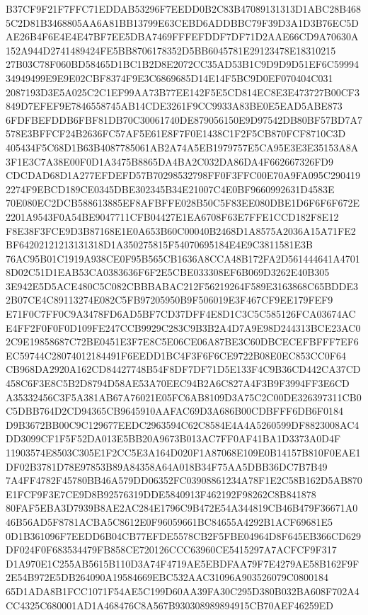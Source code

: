 \documentclass[UTF8,fontset=fandol,zihao=-4,a4paper]{ctexart}
\begin{document}
{{B37CF9F21F7FFC71EDDAB53296F7EEDD0B2C83B47089131313D1ABC28B4685C2D81B3468805AA6A81BB13799E63CEBD6ADDBBC79F39D3A1D3B76EC5D
AE26B4F6E4E4E47BF7EE5DBA7469FFFEFDDF7DF71D2AAE66CD9A70630A152A944D2741489424FE5BB8706178352D5BB6045781E29123478E18310215
27B03C78F060BD58465D1BC1B2D8E2072CC35AD53B1C9D9D9D51EF6C5999434949499E9E9E02CBF8374F9E3C6869685D14E14F5BC9D0EF070404C031
2087193D3E5A025C2C1EF99AA73B77EE142F5E5CD814EC8E3E473727B00CF3849D7EFEF9E7846558745AB14CDE3261F9CC9933A83BE0E5EAD5ABE873
6FDFBEFDDB6FBF81DB70C30061740DE879056150E9D97542DB80BF57BD7A7578E3BFFCF24B2636FC57AF5E61E8F7F0E1438C1F2F5CB870FCF8710C3D
405434F5C68D1B63B4087785061AB2A74A5EB1979757E5CA95E3E3E35153A8A3F1E3C7A38E00F0D1A3475B8865DA4BA2C032DA86DA4F662667326FD9
CDCDAD68D1A277EFDEFD57B70298532798FF0F3FFC00E70A9FA095C2904192274F9EBCD189CE0345DBE302345B34E21007C4E0BF9660992631D4583E
70E080EC2DCB588613885EF8AFBFFE028B50C5F83EE080DBE1D6F6F6F672E2201A9543F0A54BE9047711CFB04427E1EA6708F63E7FFE1CCD182F8E12
F8E38F3FCE9D3B87168E1E0A653B60C00040B2468D1A8575A2036A15A71FE2BF64202121213131318D1A350275815F54070695184E4E9C3811581E3B
76AC95B01C1919A938CE0F95B565CB1636A8CCA48B172FA2D561444641A47018D02C51D1EAB53CA0383636F6F2E5CBE033308EF6B069D3262E40B305
3E942E5D5ACE480C5C082CBBBABAC212F56219264F589E3163868C65BDDE32B07CE4C89113274E082C5FB97205950B9F506019E3F467CF9EE179FEF9
E71F0C7FF0C9A3478FD6AD5BF7CD37DFF4E8D1C3C5C585126FCA03674ACE4FF2F0F0F0D109FE247CCB9929C283C9B3B2A4D7A9E98D244313BCE23AC0
2C9E19858687C72BE0451E3F7E8C5E06CE06A87BE3C60DBCECEFBFFF7EF6EC59744C28074012184491F6EEDD1BC4F3F6F6CE9722B08E0EC853CC0F64
CB968DA2920A162CD84427748B54F8DF7DF71D5E133F4C9B36CD442CA37CD458C6F3E8C5B2D8794D58AE53A70EEC94B2A6C827A4F3B9F3994FF3E6CD
A35332456C3F5A381AB67A76021E05FC6AB8109D3A75C2C00DE326397311CB0C5DBB764D2CD94365CB9645910AAFAC69D3A686B00CDBFFF6DB6F0184
D9B3672BB00C9C129677EEDC2963594C62C8584E4A4A5260599DF8823008AC4DD3099CF1F5F52DA013E5BB20A9673B013AC7FF0AF41BA1D3373A0D4F
11903574E8503C305E1F2CC5E3A164D020F1A87068E109E0B14157B810F0EAE1DF02B3781D78E97853B89A84358A64A018B34F75AA5DBB36DC7B7B49
7A4FF4782F45780BB46A579DD06352FC03908861234A78F1E2C58B162D5AB870E1FCF9F3E7CE9D8B92576319DDE5840913F462192F98262C8B841878
80FAF5EBA3D7939B8AE2AC284E1796C9B472E54A344819CB46B479F36671A046B56AD5F8781ACBA5C8612E0F96059661BC84655A4292B1ACF69681E5
0D1B361096F7EEDD6B04CB77EFDE5578CB2F5FBE04964D8F645EB366CD629DF024F0F683534479FB858CE720126CCC63960CE5415297A7ACFCF9F317
D1A970E1C255AB5615B110D3A74F4719AE5EBDFAA79F7E4279AE58B162F9F2E54B972E5DB264090A19584669EBC532AAC31096A903526079C0800184
65D1ADA8B1FCC1071F54AE5C199D60AA39FA30C295D380B032BA608F702A4CC4325C680001AD1A468476C8A567B930308989894915CB70AEF46259ED
}}
\end{document}
